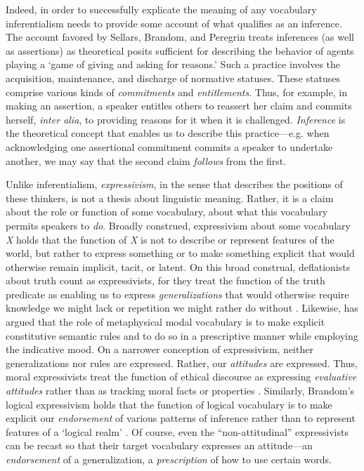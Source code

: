 \documentclass{article}
\theoremstyle{definition}
\theoremstyle{definition}
\theoremstyle{definition}
\theoremstyle{definition}
\theoremstyle{remark}
\theoremstyle{definition}
\theoremstyle{definition}
\begin{document}
Indeed, in order to successfully explicate the meaning of any vocabulary inferentialism needs to provide some account of what qualifies as an inference. The account favored by Sellars, Brandom, and Peregrin treats inferences (as well as assertions) as theoretical posits sufficient for describing the behavior of agents playing a `game of giving and asking for reasons.' Such a practice involves the acquisition, maintenance, and discharge of normative statuses. These statuses comprise various kinds of \textit{commitments} and \textit{entitlements}. Thus, for example, in making an assertion, a speaker entitles others to reassert her claim and commits herself, \textit{inter alia}, to providing reasons for it when it is challenged. \textit{Inference} is the theoretical concept that enables us to describe this practice---e.g. when acknowledging one assertional commitment commits a speaker to undertake another, we may say that the second claim \textit{follows} from the first.

Unlike inferentialism, \textit{expressivism}, in the sense that describes the positions of these thinkers, is not a thesis about linguistic meaning. Rather, it is a claim about the role or function of some vocabulary, about what this vocabulary permits speakers to \textit{do}. Broadly construed, expressivism about some vocabulary \textit{X} holds that the function of \textit{X} is not to describe or represent features of the world, but rather to express something or to make something explicit that would otherwise remain implicit, tacit, or latent. On this broad construal, deflationists about truth count as expressivists, for they treat the function of the truth predicate as enabling us to express \textit{generalizations} that would otherwise require knowledge we might lack or repetition we might rather do without \parencite[104-5]{Horwich1999}. Likewise, \textcite{Thomasson2013} has argued that the role of metaphysical modal vocabulary is to make explicit constitutive semantic rules and to do so in a prescriptive manner while employing the indicative mood. On a narrower conception of expressivism, neither generalizations nor rules are expressed. Rather, our \textit{attitudes} are expressed. Thus, moral expressivists treat the function of ethical discourse as expressing \textit{evaluative attitudes} rather than as tracking moral facts or properties \parencite{Blackburn1993,Gibbard2003}. Similarly, Brandom's  logical expressivism holds that the function of logical vocabulary is to make explicit our \textit{endorsement} of various patterns of inference  rather than to represent features of a `logical realm' \parencite{Brandom1994,Brandom2000,Brandom2008}. Of course, even the ``non-attitudinal'' expressivists can be recast so that their target vocabulary expresses an attitude---an \textit{endorsement} of a generalization, a \textit{prescription} of how to use certain words.
\end{document}
